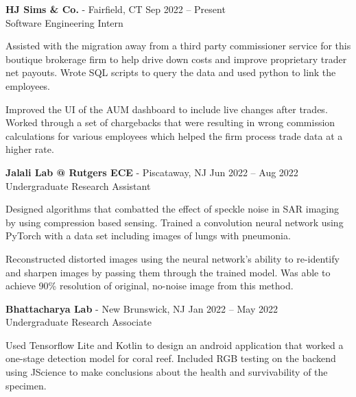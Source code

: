 \documentclass{article}
\newcommand{\employer}[4]{{
\vspace*{2pt}%
\textbf{#1} #2 \hfill #3\\ #4 \vspace*{2pt}}
}
\renewcommand{\labelitemii}{
$\vcenter{\hbox{\tiny$\bullet$}}$\hspace*{-3pt}
}
\newenvironment{bullet-list-minor}{
\begin{list}{\labelitemii}{\setlength\leftmargin{15pt} 
\topsep 0pt \itemsep -2pt}}{\vspace*{4pt}\end{list}
}
\begin{document}
    \employer{HJ Sims \& Co.}
    {- Fairfield, CT}{Sep 2022 -- Present}{Software Engineering Intern}
    \begin{bullet-list-minor}
        \item Assisted with the migration away from a third party commissioner service for this boutique brokerage firm to help drive down costs and improve proprietary trader net payouts. Wrote SQL scripts to query the data and used python to link the employees.
	\item Improved the UI of the AUM dashboard to include live changes after trades. Worked through a set of chargebacks that were resulting in wrong commission calculations for various employees which helped the firm process trade data at a higher rate.      
    \end{bullet-list-minor}
    
    \employer{Jalali Lab @ Rutgers ECE}
    {- Piscataway, NJ}{Jun 2022 -- Aug 2022}{Undergraduate Research Assistant}
    \begin{bullet-list-minor}
	\item Designed algorithms that combatted the effect of speckle noise in SAR imaging by using compression based sensing. Trained a convolution neural network using PyTorch with a data set including images of lungs with pneumonia.
	\item Reconstructed distorted images using the neural network's ability to re-identify and sharpen images by passing them through the trained model. Was able to achieve 90\% resolution of original, no-noise image from this method.  
    \end{bullet-list-minor}

    \employer{Bhattacharya Lab}
    {- New Brunswick, NJ}{Jan 2022 -- May 2022}{Undergraduate Research Associate}
    \begin{bullet-list-minor}
    \item Used Tensorflow Lite and Kotlin to design an android application that worked a one-stage detection model for coral reef. Included RGB testing on the backend using JScience to make conclusions about the health and survivability of the specimen. 
    \end{bullet-list-minor}

    
\end{document}
